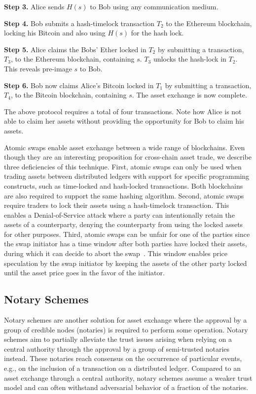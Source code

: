 \textbf{Step 3.} Alice sends $ H(s) $ to Bob using any communication medium.

\textbf{Step 4.} Bob submits a hash-timelock transaction $ T_2 $ to the Ethereum blockchain, locking his Bitcoin and also using $ H(s) $ for the hash lock.

\textbf{Step 5.} Alice claims the Bobs' Ether locked in $ T_2 $ by submitting a transaction, $ T_3 $, to the Ethereum blockchain, containing $ s $. $ T_3 $ unlocks the hash-lock in $ T_2 $. This reveals pre-image $ s $ to Bob.

\textbf{Step 6.} Bob now claims Alice's Bitcoin locked in $ T_1 $ by submitting a transaction, $ T_4 $, to the Bitcoin blockchain, containing $ s $. The asset exchange is now complete.

The above protocol requires a total of four transactions.
Note how Alice is not able to claim her assets without providing the opportunity for Bob to claim his assets.

Atomic swaps enable asset exchange between a wide range of blockchains.
Even though they are an interesting proposition for cross-chain asset trade, we describe three deficiencies of this technique.
First, atomic swaps can only be used when trading assets between distributed ledgers with support for specific programming constructs, such as time-locked and hash-locked transactions.
Both blockchains are also required to support the same hashing algorithm.
Second, atomic swaps require traders to lock their assets using a hash-timelock transaction.
This enables a Denial-of-Service attack where a party can intentionally retain the assets of a counterparty, denying the counterparty from using the locked assets for other purposes.
Third, atomic swaps can be unfair for one of the parties since the swap initiator has a time window after both parties have locked their assets, during which it can decide to abort the swap~\cite{han2019optionality}.
This window enables price speculation by the swap initiator by keeping the assets of the other party locked until the asset price goes in the favor of the initiator.

\subsection{Notary Schemes}
\label{sec:notary_schemes}
Notary schemes are another solution for asset exchange where the approval by a group of credible nodes (notaries) is required to perform some operation.
Notary schemes aim to partially alleviate the trust issues arising when relying on a central authority through the approval by a group of semi-trusted notaries instead.
These notaries reach consensus on the occurrence of particular events, e.g., on the inclusion of a transaction on a distributed ledger.
Compared to an asset exchange through a central authority, notary schemes assume a weaker trust model and can often withstand adversarial behavior of a fraction of the notaries.

